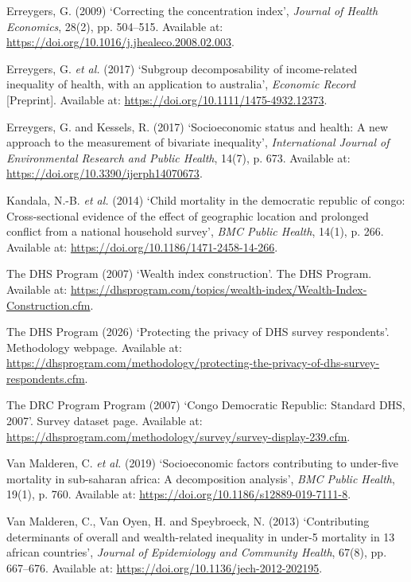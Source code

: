 \documentclass[
  11pt,
  a4paper,
]{article}
\newlength{\cslhangindent}
\newenvironment{CSLReferences}[2] %
 {\begin{list}{}{%
  \setlength{\itemindent}{0pt}
  \setlength{\leftmargin}{0pt}
  \setlength{\parsep}{0pt}
  \ifodd #1
   \setlength{\leftmargin}{\cslhangindent}
   \setlength{\itemindent}{-1\cslhangindent}
  \fi
  \setlength{\itemsep}{#2\baselineskip}}}
 {\end{list}}
\begin{document}
\protect{}\label{refs}
\begin{CSLReferences}{0}{1}
Erreygers, G. (2009) {`Correcting the concentration index'},
\emph{Journal of Health Economics}, 28(2), pp. 504--515. Available at:
\url{https://doi.org/10.1016/j.jhealeco.2008.02.003}.

Erreygers, G. \emph{et al.} (2017) {`Subgroup decomposability of
income-related inequality of health, with an application to australia'},
\emph{Economic Record} {[}Preprint{]}. Available at:
\url{https://doi.org/10.1111/1475-4932.12373}.

Erreygers, G. and Kessels, R. (2017) {`Socioeconomic status and health:
A new approach to the measurement of bivariate inequality'},
\emph{International Journal of Environmental Research and Public
Health}, 14(7), p. 673. Available at:
\url{https://doi.org/10.3390/ijerph14070673}.

Kandala, N.-B. \emph{et al.} (2014) {`Child mortality in the democratic
republic of congo: Cross-sectional evidence of the effect of geographic
location and prolonged conflict from a national household survey'},
\emph{BMC Public Health}, 14(1), p. 266. Available at:
\url{https://doi.org/10.1186/1471-2458-14-266}.

The DHS Program (2007) {`Wealth index construction'}. The DHS Program.
Available at:
\url{https://dhsprogram.com/topics/wealth-index/Wealth-Index-Construction.cfm}.

The DHS Program (2026) {`Protecting the privacy of DHS survey
respondents'}. Methodology webpage. Available at:
\url{https://dhsprogram.com/methodology/protecting-the-privacy-of-dhs-survey-respondents.cfm}.

The DRC Program Program (2007) {`{Congo Democratic Republic: Standard
DHS, 2007}'}. Survey dataset page. Available at:
\url{https://dhsprogram.com/methodology/survey/survey-display-239.cfm}.

Van Malderen, C. \emph{et al.} (2019) {`Socioeconomic factors
contributing to under-five mortality in sub-saharan africa: A
decomposition analysis'}, \emph{BMC Public Health}, 19(1), p. 760.
Available at: \url{https://doi.org/10.1186/s12889-019-7111-8}.

Van Malderen, C., Van Oyen, H. and Speybroeck, N. (2013) {`Contributing
determinants of overall and wealth-related inequality in under-5
mortality in 13 african countries'}, \emph{Journal of Epidemiology and
Community Health}, 67(8), pp. 667--676. Available at:
\url{https://doi.org/10.1136/jech-2012-202195}.

\end{CSLReferences}
\end{document}
